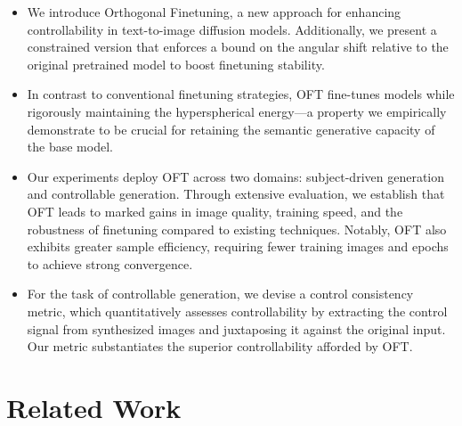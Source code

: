 \begin{itemize}[leftmargin=*,nosep]

    \item We introduce Orthogonal Finetuning, a new approach for enhancing controllability in text-to-image diffusion models. Additionally, we present a constrained version that enforces a bound on the angular shift relative to the original pretrained model to boost finetuning stability.
    \item In contrast to conventional finetuning strategies, OFT fine-tunes models while rigorously maintaining the hyperspherical energy—a property we empirically demonstrate to be crucial for retaining the semantic generative capacity of the base model.
    \item Our experiments deploy OFT across two domains: subject-driven generation and controllable generation. Through extensive evaluation, we establish that OFT leads to marked gains in image quality, training speed, and the robustness of finetuning compared to existing techniques. Notably, OFT also exhibits greater sample efficiency, requiring fewer training images and epochs to achieve strong convergence.
    \item For the task of controllable generation, we devise a control consistency metric, which quantitatively assesses controllability by extracting the control signal from synthesized images and juxtaposing it against the original input. Our metric substantiates the superior controllability afforded by OFT.
\end{itemize}

\section{Related Work}

